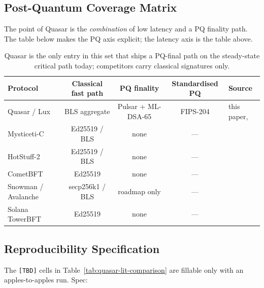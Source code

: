 \subsection{Post-Quantum Coverage Matrix}

The point of Quasar is the \emph{combination} of low latency and a PQ
finality path. The table below makes the PQ axis explicit; the latency
axis is the table above.

\begin{table}[h]
\centering
\small
\begin{tabular}{@{}lcccl@{}}
\toprule
\textbf{Protocol} & \textbf{Classical fast path} & \textbf{PQ finality} & \textbf{Standardised PQ} & \textbf{Source} \\
\midrule
Quasar / Lux            & BLS aggregate              & Pulsar + ML-DSA-65 & FIPS-204                & this paper, \cite{fips204} \\
Mysticeti-C             & Ed25519 / BLS              & none           & ---                     & \cite{babel2024mysticeti} \\
HotStuff-2              & Ed25519 / BLS              & none           & ---                     & \cite{malkhi2023hotstuff2} \\
CometBFT                & Ed25519                    & none           & ---                     & \cite{cometbftgithub} \\
Snowman / Avalanche     & secp256k1 / BLS            & roadmap only   & ---                     & \cite{rocket2019avalanche} \\
Solana TowerBFT         & Ed25519                    & none           & ---                     & \cite{yakovenko2018solana} \\
\bottomrule
\end{tabular}
\caption{Quasar is the only entry in this set that ships a PQ-final path
on the steady-state critical path today; competitors carry classical
signatures only.}
\label{tab:quasar-pq-coverage}
\end{table}

\subsection{Reproducibility Specification}
\label{sec:lit-repro}

The \texttt{[TBD]} cells in Table~\ref{tab:quasar-lit-comparison} are
fillable only with an apples-to-apples run. Spec:

